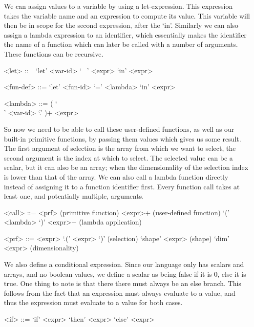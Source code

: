 \documentclass[../main.tex]{subfiles}
\newcommand{\grammarcomment}[1]{\hfill(#1)}
\begin{document}
We can assign values to a variable by using a let-expression. This expression takes the variable name and an expression to compute its value. This variable will then be in scope for the second expression, after the `in'.
Similarly we can also assign a lambda expression to an identifier, which essentially makes the identifier the name of a function which can later be called with a number of arguments. These functions can be recursive.
\begin{grammar}
<let> ::= `let' <var-id> `=' <expr> `in' <expr>

<fun-def> ::= `let' <fun-id> `=' <lambda> `in' <expr>

<lambda> ::= ( `\\' <var-id> `.' )+ <expr>
\end{grammar}

So now we need to be able to call these user-defined functions, as well as our built-in primitive functions, by passing them values which gives us some result. The first argument of selection is the array from which we want to select, the second argument is the index at which to select. The selected value can be a scalar, but it can also be an array; when the dimensionality of the selection index is lower than that of the array. We can also call a lambda function directly instead of assigning it to a function identifier first. Every function call takes at least one, and potentially multiple, arguments.
\begin{grammar}
<call> ::= <prf>                    \grammarcomment{primitive function}
      <expr>+          \grammarcomment{user-defined function}
     \alt `(' <lambda> `)' <expr>+  \grammarcomment{lambda application}

<prf> ::= <expr> `.(' <expr> `)'    \grammarcomment{selection}
    \alt `shape' <expr>             \grammarcomment{shape}
    \alt `dim' <expr>               \grammarcomment{dimensionality}
\end{grammar}

We also define a conditional expression. Since our language only has scalars and arrays, and no boolean values, we define a scalar as being false if it is 0, else it is true. One thing to note is that there there must always be an else branch. This follows from the fact that an expression must always evaluate to a value, and thus the expression must evaluate to a value for both cases.
\begin{grammar}
<if> ::= `if' <expr> `then' <expr> `else' <expr>
\end{grammar}
\end{document}
